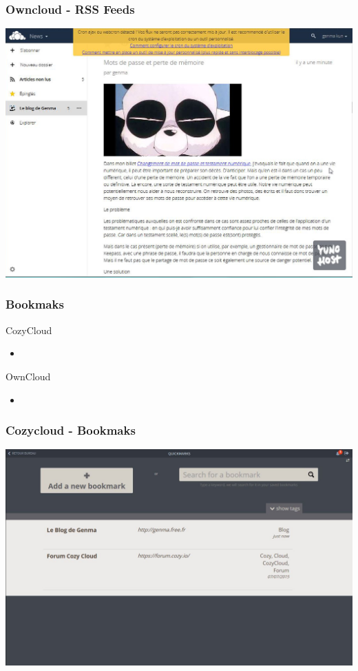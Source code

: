 \documentclass{beamer}
\begin{document}
\begin{frame}
\frametitle{Owncloud - RSS Feeds}
\includegraphics[scale=0.3] {./Owncloud/Owncloud_News.jpg}
\end{frame}

\begin{frame}
\frametitle{Bookmaks}

\begin{block}{CozyCloud}
\begin{itemize}
\item 
\end{itemize}
\end{block}

\begin{block}{OwnCloud}
\begin{itemize}
\item 
\end{itemize}
\end{block}
\end{frame}


\begin{frame}
\frametitle{Cozycloud - Bookmaks}
\includegraphics[scale=0.3] {./CozyCloud/CozyCloud_QuickMarks.jpg}
\end{frame}
\end{document}
